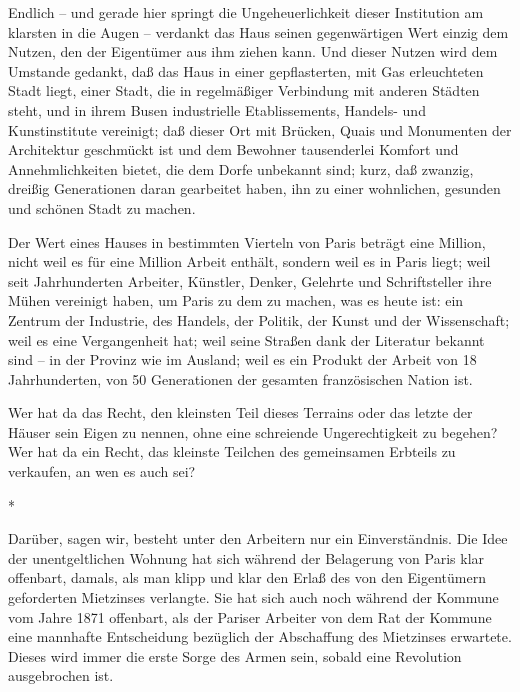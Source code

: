 \documentclass{scrbook}
\begin{document}
Endlich – und gerade hier springt die Ungeheuerlichkeit dieser Institution am klarsten in die Augen – verdankt das Haus seinen gegenwärtigen Wert einzig dem Nutzen, den der Eigentümer aus ihm ziehen kann. Und dieser Nutzen wird dem Umstande gedankt, daß das Haus in einer gepflasterten, mit Gas erleuchteten Stadt liegt, einer Stadt, die in regelmäßiger Verbindung mit anderen Städten steht, und in ihrem Busen industrielle Etablissements, Handels- und Kunstinstitute vereinigt; daß dieser Ort mit Brücken, Quais und Monumenten der Architektur geschmückt ist und dem Bewohner tausenderlei Komfort und Annehmlichkeiten bietet, die dem Dorfe unbekannt sind; kurz, daß zwanzig, dreißig Generationen daran gearbeitet haben, ihn zu einer wohnlichen, gesunden und schönen Stadt zu machen.

Der Wert eines Hauses in bestimmten Vierteln von Paris beträgt eine Million, nicht weil es für eine Million Arbeit enthält, sondern weil es in Paris liegt; weil seit Jahrhunderten Arbeiter, Künstler, Denker, Gelehrte und Schriftsteller ihre Mühen vereinigt haben, um Paris zu dem zu machen, was es heute ist: ein Zentrum der Industrie, des Handels, der Politik, der Kunst und der Wissenschaft; weil es eine Vergangenheit hat; weil seine Straßen dank der Literatur bekannt sind – in der Provinz wie im Ausland; weil es ein Produkt der Arbeit von 18 Jahrhunderten, von 50 Generationen der gesamten französischen Nation ist.

Wer hat da das Recht, den kleinsten Teil dieses Terrains oder das letzte der Häuser sein Eigen zu nennen, ohne eine schreiende Ungerechtigkeit zu begehen? Wer hat da ein Recht, das kleinste Teilchen des gemeinsamen Erbteils zu verkaufen, an wen es auch sei?

\begin{center}*\end{center}

Darüber, sagen wir, besteht unter den Arbeitern nur ein Einverständnis. Die Idee der unentgeltlichen Wohnung hat sich während der Belagerung von Paris klar offenbart, damals, als man klipp und klar den Erlaß des von den Eigentümern geforderten Mietzinses verlangte. Sie hat sich auch noch während der Kommune vom Jahre 1871 offenbart, als der Pariser Arbeiter von dem Rat der Kommune eine mannhafte Entscheidung bezüglich der Abschaffung des Mietzinses erwartete. Dieses wird immer die erste Sorge des Armen sein, sobald eine Revolution ausgebrochen ist.
\end{document}
